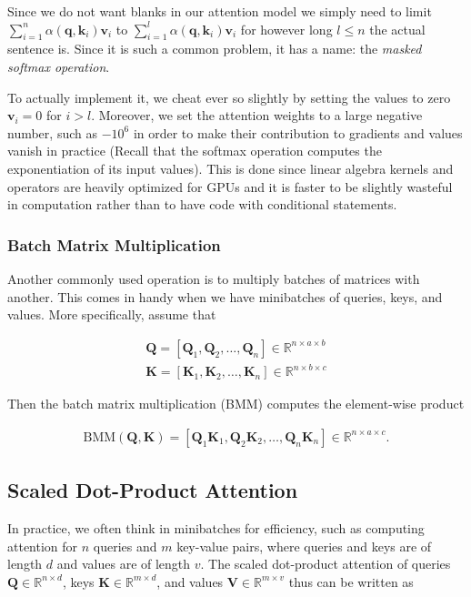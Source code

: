 \documentclass[a4paper,12pt]{article}
\theoremstyle{definition}
\begin{document}
Since we do not want blanks in our attention model we simply need to limit $\sum_{i=1}^n \alpha(\mathbf{q}, \mathbf{k}_i) \mathbf{v}_i$ to
$\sum_{i=1}^l \alpha(\mathbf{q}, \mathbf{k}_i) \mathbf{v}_i$
for however long $l \leq n$ the actual sentence is. Since it is such a common problem, it has a name: the \emph{masked softmax operation}.

To actually implement it, we cheat ever so slightly by setting the values to zero $\mathbf{v}_i = 0$ for $i > l$. Moreover, we set the attention weights to a large negative number,
such as $-10^6$ in order to make their contribution to gradients and values vanish in practice (Recall that the softmax operation computes the exponentiation of its input values).
This is done since linear algebra kernels and operators are heavily optimized for GPUs and it is faster to be slightly wasteful in computation rather than to have code with conditional statements.

\subsubsection*{Batch Matrix Multiplication}
Another commonly used operation is to multiply batches of matrices with another. This comes in handy when we have minibatches of queries, keys, and values. More specifically, assume that

\begin{align*}
    \mathbf{Q} = [\mathbf{Q}_1, \mathbf{Q}_2, \ldots, \mathbf{Q}_n]  \in \mathbb{R}^{n \times a \times b} \\
    \mathbf{K} = [\mathbf{K}_1, \mathbf{K}_2, \ldots, \mathbf{K}_n]  \in \mathbb{R}^{n \times b \times c}
\end{align*}

Then the batch matrix multiplication (BMM) computes the element-wise product

\begin{align*}
    \mathrm{BMM}(\mathbf{Q}, \mathbf{K}) = [\mathbf{Q}_1 \mathbf{K}_1, \mathbf{Q}_2 \mathbf{K}_2, \ldots, \mathbf{Q}_n \mathbf{K}_n] \in \mathbb{R}^{n \times a \times c}.
\end{align*}


\subsection*{Scaled Dot-Product Attention}
In practice, we often think in minibatches for efficiency, such as computing attention for $n$ queries and $m$ key-value pairs, where queries and keys are of length $d$
and values are of length $v$. The scaled dot-product attention of queries $\mathbf Q\in\mathbb R^{n\times d}$, keys $\mathbf K\in\mathbb R^{m\times d}$,
and values $\mathbf V\in\mathbb R^{m\times v}$ thus can be written as
\end{document}
